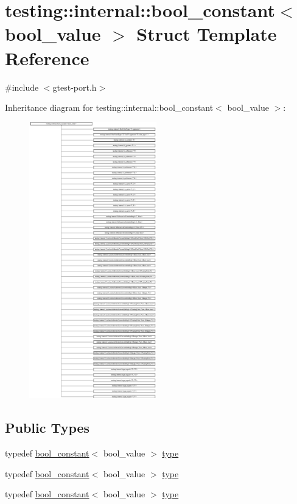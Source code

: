 \hypertarget{structtesting_1_1internal_1_1bool__constant}{}\section{testing\+::internal\+::bool\+\_\+constant$<$ bool\+\_\+value $>$ Struct Template Reference}
\label{structtesting_1_1internal_1_1bool__constant}


{\ttfamily \#include $<$gtest-\/port.\+h$>$}

Inheritance diagram for testing\+::internal\+::bool\+\_\+constant$<$ bool\+\_\+value $>$\+:\begin{figure}[H]
\begin{center}
\leavevmode
\includegraphics[height=12.000000cm]{d3/d75/structtesting_1_1internal_1_1bool__constant}
\end{center}
\end{figure}
\subsection*{Public Types}
\begin{DoxyCompactItemize}
\item 
typedef \mbox{\hyperlink{structtesting_1_1internal_1_1bool__constant}{bool\+\_\+constant}}$<$ bool\+\_\+value $>$ \mbox{\hyperlink{structtesting_1_1internal_1_1bool__constant_aba6d09ecf7eecea6c93480f0d627a167}{type}}
\item 
typedef \mbox{\hyperlink{structtesting_1_1internal_1_1bool__constant}{bool\+\_\+constant}}$<$ bool\+\_\+value $>$ \mbox{\hyperlink{structtesting_1_1internal_1_1bool__constant_aba6d09ecf7eecea6c93480f0d627a167}{type}}
\item 
typedef \mbox{\hyperlink{structtesting_1_1internal_1_1bool__constant}{bool\+\_\+constant}}$<$ bool\+\_\+value $>$ \mbox{\hyperlink{structtesting_1_1internal_1_1bool__constant_aba6d09ecf7eecea6c93480f0d627a167}{type}}
\end{DoxyCompactItemize}
